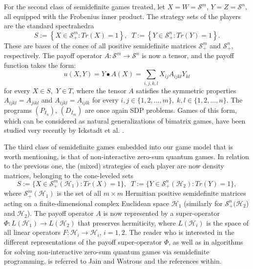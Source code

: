 \documentclass[11pt, twoside]{article}
\numberwithin{equation}{section}
\theoremstyle{definition}
\begin{document}
 For the second class of semidefinite games treated, let $X=W=\mathcal{S}^{m}$, $Y=Z=\mathcal{S}^n$, all equipped with the Frobenius inner product. The strategy sets of the players are the standard spectrahedra
\begin{equation*}
    S:= \left\{X\in \mathcal{S}^m_{+}: Tr(X)=1\right\},\;\; T:= \left\{Y\in \mathcal{S}^n_{+}: Tr(Y)=1\right\}.
\end{equation*}
These are bases of the cones of all positive semidefinite matrices $\mathcal{S}^{m}_{+}$ and $\mathcal{S}^{n}_{+}$, respectively. The payoff operator $A:\mathcal{S}^m\rightarrow\mathcal{S}^n$ is now a tensor, and the payoff function takes the form:
\begin{equation*}
    u(X,Y)=Y\bullet A(X)=\sum_{i,j,k,l}X_{ij}A_{ijkl}Y_{kl}
\end{equation*}
for every $X\in S,$ $Y\in T$, where the tensor $A$ satisfies the symmetric properties $A_{ijkl}=A_{jikl}$ and $A_{ijkl}=A_{ijlk}$ for every $i,j\in\{1,2,...,m\},\;k,l\in\{1,2,...,n\}$. The programs $(P_{I_{n}})$, $(D_{I_{m}})$ are once again SDP problems. Games of this form, which can be considered as natural generalizations of bimatrix games, have been studied very recently by Ickstadt et al. \cite{ickstadt2024semidefinite}.\par

The third class of semidefinite games embedded into our game model that is worth mentioning, is that of non-interactive zero-sum quantum games. In relation to the previous one, the (mixed) strategies of each player are now density matrices, belonging to the cone-leveled sets
\begin{equation*}
    S:= \{X\in \mathcal{S}^m_{+}(\mathcal{H}_1): Tr(X)=1\},\;\; T:= \{Y\in \mathcal{S}^n_{+}(\mathcal{H}_2): Tr(Y)=1\},
\end{equation*}
where $\mathcal{S}^m_{+}(\mathcal{H}_1)$ is the set of all $m\times m$ Hermitian positive semidefinite matrices acting on a finite-dimensional complex Euclidean space $\mathcal{H}_1$ (similarly for $\mathcal{S}^n_{+}(\mathcal{H}_2$) and $\mathcal{H}_2$). The payoff operator $A$ is now represented by a super-operator $\Phi:L(\mathcal{H}_1)\rightarrow L(\mathcal{H}_2)$ that preserves hermiticity, where $L(\mathcal{H}_i)$ is the space of all linear operators  $F:\mathcal{H}_i\rightarrow\mathcal{H}_i$, $i=1,2$. The reader who is interested in the different representations of the payoff super-operator $\Phi$, as well as in algorithms for solving non-interactive zero-sum quantum games via semidefinite programming, is referred to Jain and Watrous \cite{jain2009parallel} and the references within.
\end{document}
